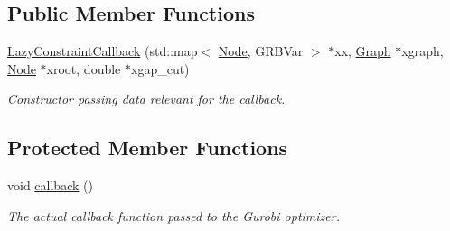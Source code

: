 \subsection*{Public Member Functions}
\begin{DoxyCompactItemize}
\item 
\hyperlink{classderegnet_1_1LazyConstraintCallback_ad025c982974ffc3e70677948b9668600}{Lazy\+Constraint\+Callback} (std\+::map$<$ \hyperlink{namespacederegnet_a744bad34f2de9856d36715a445f027f3}{Node}, G\+R\+B\+Var $>$ $\ast$xx, \hyperlink{namespacederegnet_a55b76c55bbabc682cbc61f8b9948799e}{Graph} $\ast$xgraph, \hyperlink{namespacederegnet_a744bad34f2de9856d36715a445f027f3}{Node} $\ast$xroot, double $\ast$xgap\+\_\+cut)
\begin{DoxyCompactList}\small\item\em Constructor passing data relevant for the callback. \end{DoxyCompactList}\end{DoxyCompactItemize}
\subsection*{Protected Member Functions}
\begin{DoxyCompactItemize}
\item 
void \hyperlink{classderegnet_1_1LazyConstraintCallback_ae6cde79cca11b944d25f1533727fd85b}{callback} ()
\begin{DoxyCompactList}\small\item\em The actual callback function passed to the Gurobi optimizer. \end{DoxyCompactList}\end{DoxyCompactItemize}
